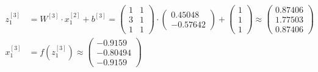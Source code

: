 \documentclass[12pt]{article}
\begin{document}
\begin{enumerate}[leftmargin=\labelsep]
\begin{align*}
                z^{[3]}_1 &= {W}^{[3]} \cdot {x}^{[2]}_1 + {b}^{[3]} = \begin{pmatrix} 1 & 1 \\ 3 & 1 \\ 1 & 1\end{pmatrix} \cdot  \begin{pmatrix} 0.45048 \\ -0.57642\end{pmatrix} +
                \begin{pmatrix} 1 \\ 1 \\ 1\end{pmatrix} \approx \begin{pmatrix} 0.87406 \\ 1.77503 \\ 0.87406\end{pmatrix} \\
                {x}^{[3]}_1 &= f\left({z}^{[3]}_1\right) \approx \begin{pmatrix} -0.9159 \\ -0.80494 \\ -0.9159\end{pmatrix}
            \end{align*}
            \endgroup


\end{enumerate}
\end{document}
